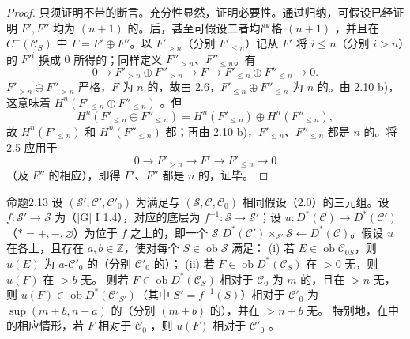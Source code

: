 \begin{proof}
只须证明不带的断言。充分性显然，证明必要性。通过归纳，可假设已经证明 $F',F''$ 均为 $(n+1)$ 的。后，甚至可假设二者均严格 $(n+1)$ ，并且在 $C^-(\mathscr C_S)$ 中 $F=F'\oplus F''$。以 $F'_{>n}$（分别 $F'_{\leq n}$）记从 $F'$ 将 $i\leq n$（分别 $i>n$）的 $F'^i$ 换成 $0$ 所得的；同样定义 $F''_{>n}$、$F''_{\leq n}$。有
\[0\longrightarrow F'_{>n}\oplus F''_{>n}\longrightarrow F\longrightarrow F'_{\leq n}\oplus F''_{\leq n}\longrightarrow0.\]
$F'_{>n}\oplus F''_{>n}$ 严格，$F$ 为 $n$ 的，故由 2.6，$F'_{\leq n}\oplus F''_{\leq n}$ 为 $n$ 的。由 2.10 b)，这意味着 $H^n(F'_{\leq n}\oplus F''_{\leq n})$ 。但
\[H^n(F'_{\leq n}\oplus F''_{\leq n})=H^n(F'_{\leq n})\oplus H^n(F''_{\leq n}),\]
故 $H^n(F'_{\leq n})$ 和 $H^n(F''_{\leq n})$ 都；再由 2.10 b)，$F'_{\leq n}$、$F''_{\leq n}$ 都是 $n$ 的。将 2.5 应用于
\[0\longrightarrow F'_{>n}\longrightarrow F'\longrightarrow F'_{\leq n}\longrightarrow0\]
（及 $F''$ 的相应），即得 $F'$、$F''$ 都是 $n$ 的，证毕。
\end{proof}
\begin{SGAresult}{命题}{2.13}
设 $(\mathscr S',\mathscr C',\mathscr C'_0)$ 为满足与 $(\mathscr S,\mathscr C,\mathscr C_0)$ 相同假设（2.0）的三元组。设 $f:\mathscr S'\to\mathscr S$ 为（[G] I 1.4），对应的底层为 $f^{-1}:\mathscr S\to\mathscr S'$；设 $u:D^*(\mathscr C)\to D^*(\mathscr C')$（$*=+,-,\varnothing$）为位于 $f$ 之上的，即一个 $\mathscr S$  $D^*(\mathscr C')\times_{\mathscr S'}\mathscr S\leftarrow D^*(\mathscr C)$。假设 $u$ 在各上，且存在 $a,b\in\mathbb Z$，使对每个 $S\in\operatorname{ob}\mathscr S$ 满足：
(i) 若 $E\in\operatorname{ob}\mathscr C_{0S}$，则 $u(E)$ 为 $a$-$\mathscr C'_0$ 的（分别 $\mathscr C'_0$ 的）；
(ii) 若 $F\in\operatorname{ob}D^*(\mathscr C_S)$ 在 $>0$ 无，则 $u(F)$ 在 $>b$ 无。
则若 $F\in\operatorname{ob}D^*(\mathscr C_S)$ 相对于 $\mathscr C_0$ 为 $m$ 的，且在 $>n$ 无，则 $u(F)\in\operatorname{ob}D^*(\mathscr C'_{S'})$（其中 $S'=f^{-1}(S)$）相对于 $\mathscr C'_0$ 为 $\sup(m+b,n+a)$ 的（分别 $(m+b)$ 的），并在 $>n+b$ 无。
特别地，在中的相应情形，若 $F$ 相对于 $\mathscr C_0$ ，则 $u(F)$ 相对于 $\mathscr C'_0$ 。
\end{SGAresult}
